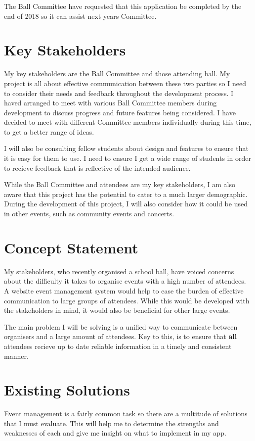 \documentclass[a4paper,oneside,12pt,draft]{report}
\begin{document}
	The Ball Committee have requested that this application be completed by the end of 2018 so it can assist next years Committee.

	\section{Key Stakeholders}
	My key stakeholders are the Ball Committee and those attending ball. My project is all about effective communication between these two parties so I need to consider their needs and feedback throughout the development process. I haved arranged to meet with various Ball Committee members during development to discuss progress and future features being considered. I have decided to meet with different Committee members individually during this time, to get a better range of ideas.

	I will also be consulting fellow students about design and features to ensure that it is easy for them to use. I need to ensure I get a wide range of students in order to recieve feedback that is reflective of the intended audience.

	While the Ball Committee and attendees are my key stakeholders, I am also aware that this project has the potential to cater to a much larger demographic. During the development of this project, I will also consider how it could be used in other events, such as community events and concerts.

	\section{Concept Statement}
	My stakeholders, who recently organised a school ball, have voiced concerns about the difficulty it takes to organise events with a high number of attendees. A website event management system would help to ease the burden of effective communication to large groups of attendees. While this would be developed with the stakeholders in mind, it would also be beneficial for other large events.

	The main problem I will be solving is a unified way to communicate between organisers and a large amount of attendees. Key to this, is to ensure that \textbf{all} attendees recieve up to date reliable information in a timely and consistent manner.

	\section{Existing Solutions}
	Event management is a fairly common task so there are a multitude of solutions that I must evaluate. This will help me to determine the strengths and weaknesses of each and give me insight on what to implement in my app.
\end{document}
